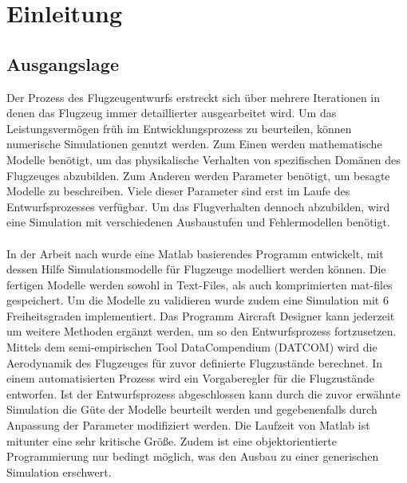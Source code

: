 \chapter{Einleitung}
\section{Ausgangslage}
\label{sec:ausgangslage}
Der Prozess des Flugzeugentwurfs erstreckt sich über mehrere Iterationen in denen das Flugzeug immer detaillierter ausgearbeitet wird. Um das Leistungsvermögen früh im Entwicklungsprozess zu beurteilen, können numerische Simulationen genutzt werden. Zum Einen werden mathematische Modelle benötigt, um das physikalische Verhalten von spezifischen Domänen des Flugzeuges abzubilden. Zum Anderen werden Parameter benötigt, um besagte Modelle zu beschreiben. Viele dieser Parameter sind erst im Laufe des Entwurfsprozesses verfügbar. Um das Flugverhalten dennoch abzubilden, wird eine Simulation mit verschiedenen Ausbaustufen und Fehlermodellen benötigt.\\\\
In der Arbeit nach  \cite{Olucak.15.02.2017} wurde eine Matlab basierendes Programm entwickelt, mit dessen Hilfe Simulationsmodelle für Flugzeuge modelliert werden können. Die fertigen Modelle werden sowohl in Text-Files, als auch komprimierten mat-files gespeichert. Um die Modelle zu validieren wurde zudem eine Simulation mit 6 Freiheitsgraden implementiert. Das Programm Aircraft Designer kann jederzeit um weitere Methoden ergänzt werden, um so den Entwurfsprozess fortzusetzen. Mittels dem semi-empirischen Tool DataCompendium (DATCOM) wird die Aerodynamik des Flugzeuges für zuvor definierte Flugzustände berechnet. In einem automatisierten Prozess wird ein Vorgaberegler für die Flugzustände entworfen. Ist der Entwurfsprozess abgeschlossen kann durch die zuvor erwähnte Simulation die Güte der Modelle beurteilt werden und gegebenenfalls durch Anpassung der Parameter modifiziert werden. Die Laufzeit von Matlab ist mitunter eine sehr kritische Größe. Zudem ist eine objektorientierte Programmierung nur bedingt möglich, was den Ausbau zu einer generischen Simulation erschwert.
\newpage
